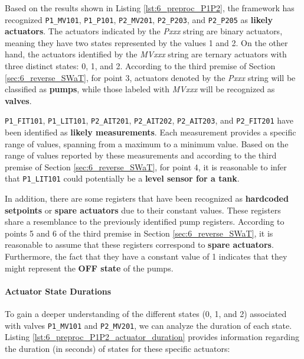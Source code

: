 Based on the results shown in Listing \ref{lst:6_preproc_P1P2}, the framework has recognized \texttt{P1\_MV101}, \texttt{P1\_P101}, \texttt{P2\_MV201}, \texttt{P2\_P203}, and \texttt{P2\_P205} as \textbf{likely actuators}. The actuators indicated by the \textit{Pxxx} string are binary actuators, meaning they have two states represented by the values 1 and 2. On the other hand, the actuators identified by the \textit{MVxxx} string are ternary actuators with three distinct states: 0, 1, and 2. According to the third premise of Section \ref{sec:6_reverse_SWaT}, for point 3, actuators denoted by the \textit{Pxxx} string will be classified as \textbf{pumps}, while those labeled with \textit{MVxxx} will be recognized as \textbf{valves}.

\bigskip
\texttt{P1\_FIT101}, \texttt{P1\_LIT101}, \texttt{P2\_AIT201}, \texttt{P2\_AIT202}, \texttt{P2\_AIT203}, and \texttt{P2\_FIT201} have been identified as \textbf{likely measurements}. Each measurement provides a specific range of values, spanning from a maximum to a minimum value. Based on the range of values reported by these measurements and according to the third premise of Section \ref{sec:6_reverse_SWaT}, for point 4, it is reasonable to infer that \texttt{P1\_LIT101} could potentially be a \textbf{level sensor for a tank}.

\bigskip
In addition, there are some registers that have been recognized as \textbf{hardcoded setpoints} or \textbf{spare actuators} due to their constant values. These registers share a resemblance to the previously identified pump registers. According to points 5 and 6 of the third premise in Section \ref{sec:6_reverse_SWaT}, it is reasonable to assume that these registers correspond to \textbf{spare actuators}. Furthermore, the fact that they have a constant value of 1 indicates that they might represent the \textbf{OFF state} of the pumps.

\paragraph{Actuator State Durations}
\label{par:6_P1P2_actuators_duration}
To gain a deeper understanding of the different states (0, 1, and 2) associated with valves \texttt{P1\_MV101} and \texttt{P2\_MV201}, we can analyze the duration of each state. Listing \ref{lst:6_preproc_P1P2_actuator_duration} provides information regarding the duration (in seconds) of states for these specific actuators:

